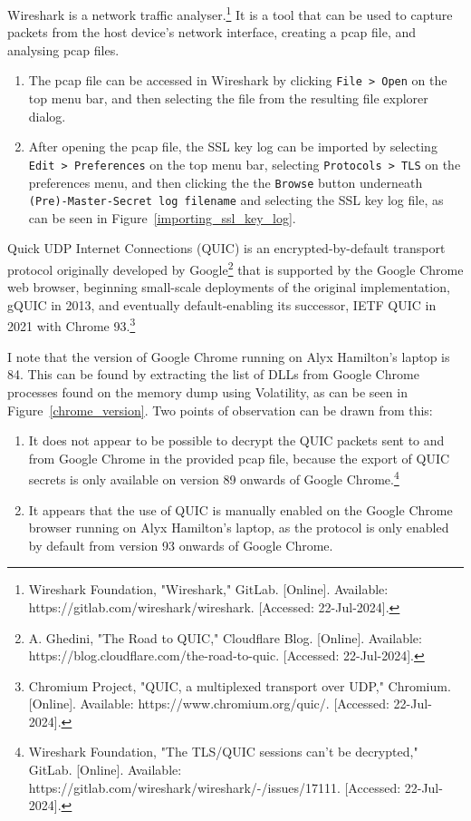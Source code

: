 \begin{myenum}
	\item Wireshark is a network traffic analyser.\footnote{Wireshark Foundation, "Wireshark," GitLab. [Online]. Available: https://gitlab.com/wireshark/wireshark. [Accessed: 22-Jul-2024].} It is a tool that can be used to capture packets from the host device's network interface, creating a pcap file, and analysing pcap files.
		\begin{enumerate}
			\item The pcap file can be accessed in Wireshark by clicking \texttt{File > Open}  on the top menu bar, and then selecting the file from the resulting file explorer dialog.
			\item After opening the pcap file, the SSL key log can be imported by selecting \texttt{Edit > Preferences} on the top menu bar, selecting \texttt{Protocols > TLS} on the preferences menu, and then clicking the the \texttt{Browse} button underneath \texttt{(Pre)-Master-Secret log filename} and selecting the SSL key log file, as can be seen in Figure~\ref{importing_ssl_key_log}.
		\end{enumerate}
	\item Quick UDP Internet Connections (QUIC) is an encrypted-by-default transport protocol originally developed by Google\footnote{A. Ghedini, "The Road to QUIC," Cloudflare Blog. [Online]. Available: https://blog.cloudflare.com/the-road-to-quic. [Accessed: 22-Jul-2024].} that is supported by the Google Chrome web browser, beginning small-scale deployments of the original implementation, gQUIC in 2013, and eventually default-enabling its successor, IETF QUIC in 2021 with Chrome 93.\footnote{Chromium Project, "QUIC, a multiplexed transport over UDP," Chromium. [Online]. Available: https://www.chromium.org/quic/. [Accessed: 22-Jul-2024].}
	\item I note that the version of Google Chrome running on Alyx Hamilton's laptop is 84. This can be found by extracting the list of DLLs from Google Chrome processes found on the memory dump using Volatility, as can be seen in Figure~\ref{chrome_version}.
	 Two points of observation can be drawn from this:
		\begin{enumerate}
			\item It does not appear to be possible to decrypt the QUIC packets sent to and from Google Chrome in the provided pcap file, because the export of QUIC secrets is only available on version 89 onwards of Google Chrome.\footnote{Wireshark Foundation, "The TLS/QUIC sessions can't be decrypted," GitLab. [Online]. Available: https://gitlab.com/wireshark/wireshark/-/issues/17111. [Accessed: 22-Jul-2024].}
			\item It appears that the use of QUIC is manually enabled on the Google Chrome browser running on Alyx Hamilton's laptop, as the protocol is only enabled by default from version 93 onwards of Google Chrome.
		\end{enumerate}
\end{myenum}


